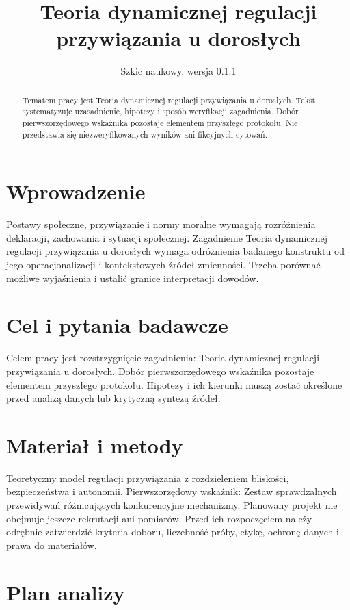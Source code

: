 \documentclass[11pt,a4paper]{article}
\title{Teoria dynamicznej regulacji przywiązania u dorosłych}
\author{}
\date{Szkic naukowy, wersja 0.1.1}
\begin{document}
\maketitle

\begin{abstract}

Tematem pracy jest Teoria dynamicznej regulacji przywiązania u dorosłych. Tekst systematyzuje uzasadnienie, hipotezy i sposób weryfikacji zagadnienia. Dobór pierwszorzędowego wskaźnika pozostaje elementem przyszłego protokołu. Nie przedstawia się niezweryfikowanych wyników ani fikcyjnych cytowań.

\end{abstract}

\section{Wprowadzenie}

Postawy społeczne, przywiązanie i normy moralne wymagają rozróżnienia deklaracji, zachowania i sytuacji społecznej. Zagadnienie Teoria dynamicznej regulacji przywiązania u dorosłych wymaga odróżnienia badanego konstruktu od jego operacjonalizacji i kontekstowych źródeł zmienności. Trzeba porównać możliwe wyjaśnienia i ustalić granice interpretacji dowodów.

\section{Cel i pytania badawcze}

Celem pracy jest rozstrzygnięcie zagadnienia: Teoria dynamicznej regulacji przywiązania u dorosłych. Dobór pierwszorzędowego wskaźnika pozostaje elementem przyszłego protokołu. Hipotezy i ich kierunki muszą zostać określone przed analizą danych lub krytyczną syntezą źródeł.

\section{Materiał i metody}

Teoretyczny model regulacji przywiązania z rozdzieleniem bliskości, bezpieczeństwa i autonomii. Pierwszorzędowy wskaźnik: Zestaw sprawdzalnych przewidywań różnicujących konkurencyjne mechanizmy. Planowany projekt nie obejmuje jeszcze rekrutacji ani pomiarów. Przed ich rozpoczęciem należy odrębnie zatwierdzić kryteria doboru, liczebność próby, etykę, ochronę danych i prawa do materiałów.

\section{Plan analizy}
\end{document}
